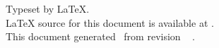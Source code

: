 
Typeset by \LaTeX.
\\
{\LaTeX} source for this document is available at
.
\\
This document generated \GITAuthorDate\ from revision
\ifx\GITTags\empty
\GITAbrHash
\else
\GITAbrHash\ \GITTags
\fi
.
